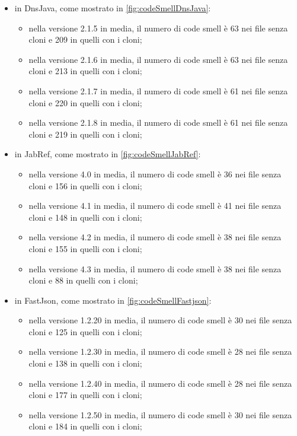 \begin{itemize}
	\item in DnsJava, come mostrato in \autoref{fig:codeSmellDnsJava}:
	\begin{itemize}
		\item nella versione 2.1.5 in media, il numero di code smell è 63 nei file senza cloni e 209 in quelli con i cloni;
		\item nella versione 2.1.6 in media, il numero di code smell è 63 nei file senza cloni e 213 in quelli con i cloni;
		\item nella versione 2.1.7 in media, il numero di code smell è 61 nei file senza cloni e 220 in quelli con i cloni;
		\item nella versione 2.1.8 in media, il numero di code smell è 61 nei file senza cloni e 219 in quelli con i cloni;
	\end{itemize}
	\item in JabRef, come mostrato in \autoref{fig:codeSmellJabRef}:
	\begin{itemize}
		\item nella versione 4.0 in media, il numero di code smell è 36 nei file senza cloni e 156 in quelli con i cloni;
		\item nella versione 4.1 in media, il numero di code smell è 41 nei file senza cloni e 148 in quelli con i cloni;
		\item nella versione 4.2 in media, il numero di code smell è 38 nei file senza cloni e 155 in quelli con i cloni;
		\item nella versione 4.3 in media, il numero di code smell è 38 nei file senza cloni e 88 in quelli con i cloni;
	\end{itemize}
	\item in FastJson, come mostrato in \autoref{fig:codeSmellFastjson}:
	\begin{itemize}
		\item nella versione 1.2.20 in media, il numero di code smell è 30 nei file senza cloni e 125 in quelli con i cloni;
		\item nella versione 1.2.30 in media, il numero di code smell è 28 nei file senza cloni e 138 in quelli con i cloni;
		\item nella versione 1.2.40 in media, il numero di code smell è 28 nei file senza cloni e 177 in quelli con i cloni;
		\item nella versione 1.2.50 in media, il numero di code smell è 30 nei file senza cloni e 184 in quelli con i cloni;
	\end{itemize}
\end{itemize}
